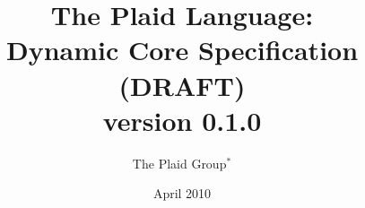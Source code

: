\documentclass[12pt]{article}
\title{The Plaid Language:\\
Dynamic Core Specification (DRAFT)\\ %
\vspace{2ex}
version 0.1.0\\
\vspace{2ex}
}
\author{The Plaid Group$^{\ast}$
}
\date{April 2010}
\begin{document}
\renewcommand*{\thepage}{title-\arabic{page}} 
\maketitle
\renewcommand*{\thepage}{\arabic{page}} 







\end{document}
